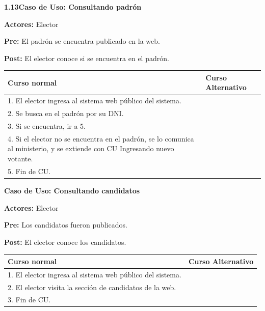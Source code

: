 \textbf{1.13Caso de Uso:  Consultando padrón}

\textbf{Actores:} Elector 

\textbf{Pre:} El padrón se encuentra publicado en la web. 

\textbf{Post:}  El elector conoce si se encuentra en el padrón.

\begin{table}[h!]
	
 \begin{tabular}{|p{7.5cm} | p{7.5cm}|} 
 \hline
 \textbf{Curso normal} & \textbf{Curso Alternativo} \\
 \hline

1. El elector ingresa al sistema web público del sistema. & \\
 \hline



2. Se busca en el padrón por su DNI. & \\
 \hline



3. Si se encuentra, ir a 5. & \\
 \hline



4. Si el elector no se encuentra en el padrón, se lo comunica al ministerio, y se extiende con CU Ingresando nuevo votante. & \\
 \hline



5. Fin de CU. & \\
 \hline


 \end{tabular}

\end{table}


	

\textbf{Caso de Uso: Consultando candidatos}

\textbf{Actores:} Elector 

\textbf{Pre:} Los candidatos fueron publicados.

\textbf{Post:}  El elector conoce los candidatos.
\begin{table}[h!]
	
 \begin{tabular}{|p{7.5cm} | p{7.5cm}|} 
 \hline
 \textbf{Curso normal} & \textbf{Curso Alternativo} \\
 \hline
 
1. El elector ingresa al sistema web público del sistema. & \\
 \hline



2. El elector visita la sección de candidatos de la web. & \\
 \hline


3. Fin de CU. & \\
 \hline


 \end{tabular}

\end{table}


